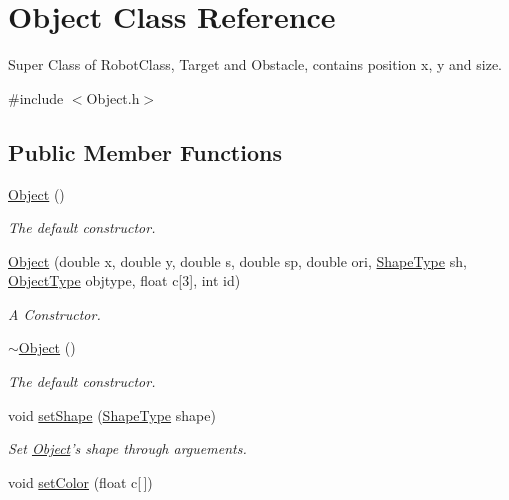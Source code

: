 \hypertarget{classObject}{\section{Object Class Reference}
\label{classObject}
}


Super Class of Robot\-Class, Target and Obstacle, contains position x, y and size.  




{\ttfamily \#include $<$Object.\-h$>$}

\subsection*{Public Member Functions}
\begin{DoxyCompactItemize}
\item 
\hyperlink{classObject_a40860402e64d8008fb42329df7097cdb}{Object} ()
\begin{DoxyCompactList}\small\item\em The default constructor. \end{DoxyCompactList}\item 
\hyperlink{classObject_a1578ef305ecdd88d8b2c0b4408d0f4f2}{Object} (double x, double y, double s, double sp, double ori, \hyperlink{Object_8h_a5a4538eeab397888d88a4eefcc5a1345}{Shape\-Type} sh, \hyperlink{Object_8h_a842c5e2e69277690b064bf363c017980}{Object\-Type} objtype, float c\mbox{[}3\mbox{]}, int id)
\begin{DoxyCompactList}\small\item\em A Constructor. \end{DoxyCompactList}\item 
\hyperlink{classObject_ae8f5483f459e46687bd01e6f9977afd3}{$\sim$\-Object} ()
\begin{DoxyCompactList}\small\item\em The default constructor. \end{DoxyCompactList}\item 
void \hyperlink{classObject_a20943e8303df77a63e7173b7cb31fcb4}{set\-Shape} (\hyperlink{Object_8h_a5a4538eeab397888d88a4eefcc5a1345}{Shape\-Type} shape)
\begin{DoxyCompactList}\small\item\em Set \hyperlink{classObject}{Object}'s shape through arguements. \end{DoxyCompactList}\item 
void \hyperlink{classObject_a24d288762ff0406ea1018ce0063c5636}{set\-Color} (float c\mbox{[}$\,$\mbox{]})

\end{DoxyCompactItemize}
